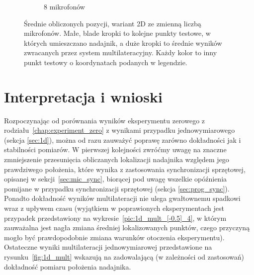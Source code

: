 \begin{figure}[H]
\begin{subfigure}{.5\textwidth}
        \caption{8 mikrofonów}
        \label{pic:2d_8_num_mult}
    \end{subfigure}
    \caption[Wyniki eksperymentu dla wersji 2D ze zmienną liczbą mikrofonów]{Średnie obliczonych pozycji, wariant 2D ze zmienną liczbą mikrofonów. Małe, blade kropki to kolejne punkty testowe, w których umieszczano nadajnik, a duże kropki to średnie wyników zwracanych przez system multilateracyjny. Każdy kolor to inny punkt testowy o koordynatach podanych w legendzie.}
    \label{fig:2d_num_mult}
\end{figure}

\section{Interpretacja i wnioski}

Rozpoczynając od porównania wyników eksperymentu zerowego z rodziału~\ref{chap:experiment_zero} z wynikami przypadku jednowymiarowego (sekcja \ref{sec:1d}), można od razu zauważyć poprawę zarówno dokładności jak i stabilności pomiarów. W pierwszej kolejności zwróćmy uwagę na znaczne zmniejszenie przesunięcia obliczanych lokalizacji nadajnika względem jego prawdziwego położenia, które wynika z zastosowania synchronizacji sprzętowej, opisanej w sekcji~\ref{sec:mic_sync}, biorącej pod uwagę wszelkie opóźnienia pomijane w przypadku synchronizacji sprzętowej (sekcja \ref{sec:prog_sync}). Ponadto dokładność wyników multilateracji nie ulega gwałtownemu spadkowi wraz z upływem czasu (wyjątkiem w poprawionych eksperymentach jest przypadek przedstawiony na wykresie~\ref{pic:1d_mult_[-0.5]_4}, w którym zauważalna jest nagła zmiana średniej lokalizowanych punktów, czego przyczyną mogło być prawdopodobnie zmiana warunków otoczenia eksperymentu). Ostateczne wyniki multilateracji jednowymiarowej przedstawione na rysunku~\ref{fig:1d_mult} wskazują na zadowalającą (w zależności od zastosowań) dokładność pomiaru położenia nadajnika.


